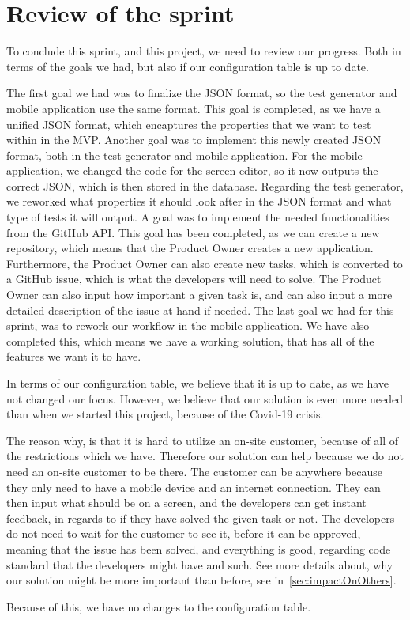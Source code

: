 \section{Review of the sprint}
To conclude this sprint, and this project, we need to review our progress.
Both in terms of the goals we had, but also if our configuration table is up to date.

The first goal we had was to finalize the JSON format, so the test generator and mobile application use the same format.
This goal is completed, as we have a unified JSON format, which encaptures the properties that we want to test within in the MVP.
Another goal was to implement this newly created JSON format, both in the test generator and mobile application.
For the mobile application, we changed the code for the screen editor, so it now outputs the correct JSON, which is then stored in the database.
Regarding the test generator, we reworked what properties it should look after in the JSON format and what type of tests it will output.
A goal was to implement the needed functionalities from the GitHub API.
This goal has been completed, as we can create a new repository, which means that the Product Owner creates a new application.
Furthermore, the Product Owner can also create new tasks, which is converted to a GitHub issue, which is what the developers will need to solve.
The Product Owner can also input how important a given task is, and can also input a more detailed description of the issue at hand if needed.
The last goal we had for this sprint, was to rework our workflow in the mobile application.
We have also completed this, which means we have a working solution, that has all of the features we want it to have.

In terms of our configuration table, we believe that it is up to date, as we have not changed our focus.
However, we believe that our solution is even more needed than when we started this project, because of the Covid-19 crisis.

The reason why, is that it is hard to utilize an on-site customer, because of all of the restrictions which we have.
Therefore our solution can help because we do not need an on-site customer to be there.
The customer can be anywhere because they only need to have a mobile device and an internet connection.
They can then input what should be on a screen, and the developers can get instant feedback, in regards to if they have solved the given task or not.
The developers do not need to wait for the customer to see it, before it can be approved, meaning that the issue has been solved, and everything is good, regarding code standard that the developers might have and such.
See more details about, why our solution might be more important than before, see in~\autoref{sec:impactOnOthers}.

Because of this, we have no changes to the configuration table.